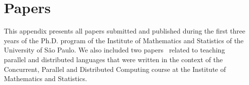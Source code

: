 \documentclass[12pt,twoside,a4paper]{book}
\renewcommand{\chaptermark}[1]{\markboth{#1}{}}
\begin{document}
%
%

\listoffigures

\listoftables

\mainmatter


\onehalfspacing            %



%








\appendix

\chapter{Papers}
\label{chap:papers}

This appendix presents all papers submitted and published during the first
three years of the Ph.D. program of the Institute of Mathematics and Statistics
of the University of São Paulo. We also included two
papers~\cite{goncalves2016openmp,bruel2017openmp} related to teaching parallel
and distributed languages that were written in the context of the Concurrent,
Parallel and Distributed Computing course at the Institute of Mathematics and
Statistics.
\end{document}
